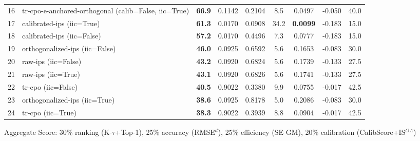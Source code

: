 \begin{table}[htbp]
\begin{tabular}{cl|c|cccccc}
16 & tr-cpo-e-anchored-orthogonal (calib=False, iic=True) & \textbf{66.9} & 0.1142 & 0.2104 & 8.5 & 0.0497 & -0.050 & 40.0 \\
17 & calibrated-ips (iic=True) & \textbf{61.3} & 0.0170 & 0.0908 & 34.2 & \textbf{0.0099} & -0.183 & 15.0 \\
18 & calibrated-ips (iic=False) & \textbf{57.2} & 0.0170 & 0.4496 & 7.3 & 0.0777 & -0.183 & 15.0 \\
19 & orthogonalized-ips (iic=False) & \textbf{46.0} & 0.0925 & 0.6592 & 5.6 & 0.1653 & -0.083 & 30.0 \\
20 & raw-ips (iic=False) & \textbf{43.2} & 0.0920 & 0.6824 & 5.6 & 0.1739 & -0.133 & 27.5 \\
21 & raw-ips (iic=True) & \textbf{43.1} & 0.0920 & 0.6826 & 5.6 & 0.1741 & -0.133 & 27.5 \\
22 & tr-cpo (iic=False) & \textbf{40.5} & 0.9022 & 0.3380 & 9.9 & 0.0755 & -0.017 & 42.5 \\
23 & orthogonalized-ips (iic=True) & \textbf{38.6} & 0.0925 & 0.8178 & 5.0 & 0.2086 & -0.083 & 30.0 \\
24 & tr-cpo (iic=True) & \textbf{38.3} & 0.9022 & 0.3939 & 8.8 & 0.0904 & -0.017 & 42.5 \\
\bottomrule
\end{tabular}
\footnotesize{Aggregate Score: 30\% ranking (K-$\tau$+Top-1), 25\% accuracy (RMSE$^d$), 25\% efficiency (SE GM), 20\% calibration (CalibScore+IS$^{OA}$)}
\end{table}